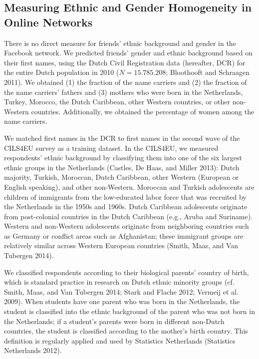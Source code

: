\documentclass[letterpaper]{article} %
\begin{document}
\subsection{Measuring Ethnic and Gender Homogeneity in Online Networks}

There is no direct measure for friends’ ethnic
background and gender in the Facebook network.
We predicted friends’ gender and ethnic background based on their first names, using the Dutch Civil Registration data (hereafter, DCR) for the entire Dutch population in 2010 ($N = 15.785.208$; Bloothooft and Schraagen 2011). We obtained (1) the fraction of the name carriers and (2) the fraction of the name carriers’ fathers and (3) mothers who were born in the Netherlands, Turkey, Morocco, the Dutch Caribbean, other Western countries, or other non-Western countries. Additionally, we obtained the percentage of women among the name carriers.

We matched first names in the DCR to first names in the second wave of the CILS4EU survey as a training dataset. In the CILS4EU, we measured respondents’ ethnic background by classifying them into one of the six largest ethnic groups in the Netherlands (Castles, De Haas, and Miller 2013): Dutch majority, Turkish, Moroccan, Dutch Caribbean, other Western (European or English speaking), and other non-Western. Moroccan and Turkish adolescents are children of immigrants from the low-educated labor force that was
recruited by the Netherlands in the 1950s and
1960s. Dutch Caribbean adolescents originate
from post-colonial countries in the Dutch Caribbean (e.g., Aruba and Suriname). Western and non-Western adolescents originate from neighboring countries such as Germany or conflict areas such as Afghanistan; these immigrant groups are relatively similar across Western European countries (Smith, Maas, and Van Tubergen 2014).

We classified respondents according to their biological parents’ country of birth, which is standard practice in research on Dutch ethnic minority groups (cf. Smith, Maas, and Van Tubergen 2014; Stark and Flache 2012; Vermeij et al. 2009). When students have one parent who was born in the Netherlands, the student is classified into the ethnic background of the parent who was not born in the Netherlands; if a student’s parents were born in different non-Dutch countries, the student is classified according to the mother’s birth country. This definition is regularly applied and used by Statistics Netherlands (Statistics Netherlands 2012).
\end{document}
